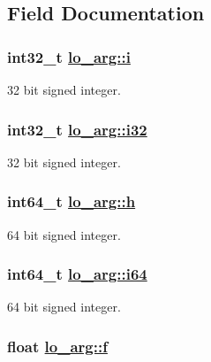 \subsection{Field Documentation}
\hypertarget{unionlo__arg_7eefb9548603ff68b4fbd4c4d41c648b}{
\subsubsection[i]{\setlength{\rightskip}{0pt plus 5cm}int32\_\-t \hyperlink{unionlo__arg_7eefb9548603ff68b4fbd4c4d41c648b}{lo\_\-arg::i}}}
\label{unionlo__arg_7eefb9548603ff68b4fbd4c4d41c648b}


32 bit signed integer. \hypertarget{unionlo__arg_07e800463dc4ec5066b01033457ca018}{
\subsubsection[i32]{\setlength{\rightskip}{0pt plus 5cm}int32\_\-t \hyperlink{unionlo__arg_07e800463dc4ec5066b01033457ca018}{lo\_\-arg::i32}}}
\label{unionlo__arg_07e800463dc4ec5066b01033457ca018}


32 bit signed integer. \hypertarget{unionlo__arg_1773bb0e69aa3b137ddc26044334b2b4}{
\subsubsection[h]{\setlength{\rightskip}{0pt plus 5cm}int64\_\-t \hyperlink{unionlo__arg_1773bb0e69aa3b137ddc26044334b2b4}{lo\_\-arg::h}}}
\label{unionlo__arg_1773bb0e69aa3b137ddc26044334b2b4}


64 bit signed integer. \hypertarget{unionlo__arg_fe8046a8395e9af51cc759034ccfedd5}{
\subsubsection[i64]{\setlength{\rightskip}{0pt plus 5cm}int64\_\-t \hyperlink{unionlo__arg_fe8046a8395e9af51cc759034ccfedd5}{lo\_\-arg::i64}}}
\label{unionlo__arg_fe8046a8395e9af51cc759034ccfedd5}


64 bit signed integer. \hypertarget{unionlo__arg_d61c0f83abb077ce656b3a39d5c7e19f}{
\subsubsection[f]{\setlength{\rightskip}{0pt plus 5cm}float \hyperlink{unionlo__arg_d61c0f83abb077ce656b3a39d5c7e19f}{lo\_\-arg::f}}}
\label{unionlo__arg_d61c0f83abb077ce656b3a39d5c7e19f}


